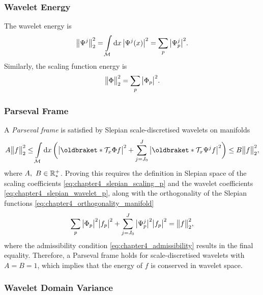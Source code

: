 \subsubsection{Wavelet Energy}

The wavelet energy is
%
\begin{equation}
	{\big\lVert\Psi^{j}\big\rVert}_{2}^{2}
	= \int\limits_{\mathcal{M}} \dd{x} \big\lvert\Psi^{j}(x)\big\rvert^{2}
	= \sum\limits_{p} \big\lvert{\Psi}_{p}^{j}\big\rvert^{2}.
\end{equation}
%
Similarly, the scaling function energy is
%
\begin{equation}
	{\big\lVert\Phi\big\rVert}_{2}^{2}
	= \sum\limits_{p} \big\lvert{\Phi}_{p}\big\rvert^{2}.
\end{equation}

\subsubsection{Parseval Frame}

A \emph{Parseval frame} is satisfied by Slepian scale-discretised wavelets on manifolds
%
\begin{equation}
	A\norm{f}^{2} \leq \integrateManifold{x} \bigg(
	\abs{\braket{\translation{x}\Phi}{f}}^{2}
	+ \waveletSum \abs{\braket{\translation{x}\Psi^{j}}{f}}^{2}
	\bigg) \leq B\norm{f}^{2},
\end{equation}
%
where \(A,\ B \in \mathbb{R}_{\ast}^{+}{}\).
Proving this requires the definition in Slepian space of the scaling coefficients \cref{eq:chapter4_slepian_scaling_p} and the wavelet coefficients \cref{eq:chapter4_slepian_wavelet_p}, along with the orthogonality of the Slepian functions \cref{eq:chapter4_orthogonality_manifold}
%
\begin{equation}
	\sum\limits_{p} \big\lvert{\Phi}_{p}\big\rvert^{2} \big\lvert{f}_{p}\big\rvert^{2}
	+ \sum\limits_{j=J_{0}}^{J} \big\lvert{\Psi}_{p}^{j}\big\rvert^{2} \big\lvert{f}_{p}\big\rvert^{2}
	= {\big\lVert f\big\rVert}_{2}^{2},
\end{equation}
%
where the admissibility condition \cref{eq:chapter4_admissibility} results in the final equality.
Therefore, a Parseval frame holds for scale-discretised wavelets with \(A = B = 1\), which implies that the energy of \(f\) is conserved in wavelet space.

\subsubsection{Wavelet Domain Variance}

